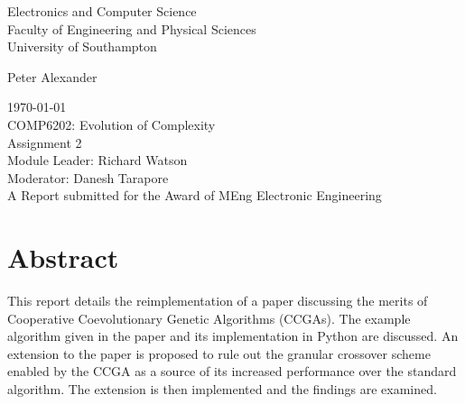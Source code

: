 \documentclass[12pt]{article}
\begin{document}
\begin{titlepage}
    \begin{center}
        {\LARGE Electronics and Computer Science\\ Faculty of Engineering and Physical Sciences\\}
        \vspace{0.4cm}
        {\LARGE University of Southampton}
        
        \vfill
        {\Large Peter Alexander\\}
        
        \vspace{1cm}
        {\Large \today\\}
        \vspace{1cm}
        {\LARGE COMP6202: Evolution of Complexity\\}
        {\Large Assignment 2\\}
        \vfill
        {\Large Module Leader: Richard Watson\\}
        \vspace{0.3cm}
        {\Large Moderator: Danesh Tarapore\\}
        \vfill
        \Large A Report submitted for the Award of MEng Electronic Engineering

    \end{center}
    \restoregeometry
\end{titlepage}

\section*{Abstract}
This report details the reimplementation of a paper discussing the merits of Cooperative Coevolutionary Genetic Algorithms (CCGAs)\cite{original-paper}.
The example algorithm given in the paper and its implementation in Python are discussed.
An extension to the paper is proposed to rule out the granular crossover scheme enabled by the CCGA as a source of its increased performance over the standard algorithm.
The extension is then implemented and the findings are examined.

\newpage


\newpage
\setcounter{tocdepth}{2}

\newpage
\tableofcontents
\newpage
\setcounter{page}{1}
\pagestyle{plain}








\printbibliography

\pagestyle{empty}

\appendix


\end{document}
